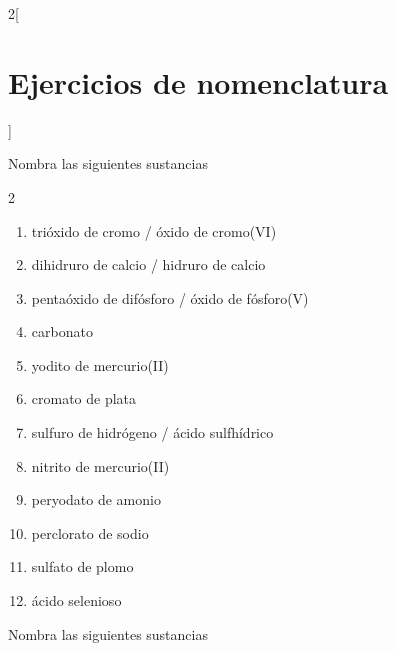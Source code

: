 \documentclass[10pt]{article}
\begin{document}
\begin{multicols*}{2}[
  \section{Ejercicios de nomenclatura}
  ]
\begin{exercise}[
    tags    = {inorgánica,nomenclatura,múltiple,2B},
    topics  = {química inorgánica,formulación,nomenclatura},
    source  = {Química 2B SAN 2016, p372, e10},
  ]
  Nombra las siguientes sustancias

  \begin{enumerate}\begin{multicols}{2}
    \item {}
    \item {}
    \item {}
    \item {}
    \item {}
    \item {}
    \item {}
    \item {}
    \item {}
    \item {}
    \item {}
    \item {}
  \end{multicols}\end{enumerate}
\end{exercise}

\begin{solution}
  \begin{enumerate}
    \item trióxido de cromo / óxido de cromo(VI)
    \item dihidruro de calcio / hidruro de calcio
    \item pentaóxido de difósforo / óxido de fósforo(V)
    \item carbonato
    \item yodito de mercurio(II)
    \item cromato de plata
    \item sulfuro de hidrógeno / ácido sulfhídrico
    \item nitrito de mercurio(II)
    \item peryodato de amonio
    \item perclorato de sodio
    \item sulfato de plomo
    \item ácido selenioso
  \end{enumerate}
\end{solution}




\begin{exercise}[
    tags    = {inorgánica,nomenclatura,múltiple,2B},
    topics  = {química inorgánica,formulación,nomenclatura},
    source  = {Química 2B SAN 2016, p372, e11},
  ]
  Nombra las siguientes sustancias


\end{exercise}
\end{multicols*}
\end{document}
